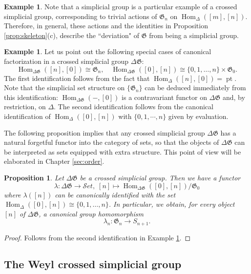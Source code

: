 \documentclass[english,11pt,leqno]{article}
\def\Gen{\mathfrak{G}}
\def\Hom{\operatorname{Hom}}
\def\pt{\operatorname{pt}\nolimits}
\def\lra{\longrightarrow}
\def\Hom{\operatorname{Hom}}
\def\Set{ {\mathcal Set}}
\def\Set{ {\mathcal Set}}
\def\DG{ {\Delta \Gen}}
\newtheorem{prop}[thm]{Proposition}
\theoremstyle{definition}
\newtheorem{exa}[thm]{Example}
\theoremstyle{remark}
\numberwithin{equation}{section}
\begin{document}
	\begin{exa}\label{exa:deviation}
Note that a simplicial group is a particular example of a crossed simplicial group, corresponding to
trivial actions of $\Gen_n$ on $\Hom_\Delta([m], [n])$. Therefore, in general, these actions and the identities
in Proposition \ref{prop:skeleton}(c), describe the ``deviation" of  $\Gen$  from being a simplicial
group. 
\end{exa}

\begin{exa}\label{ex:extreme} 
Let us point out the following special cases of canonical factorization in a crossed simplicial
group $\DG$:
\[
\Hom_\DG([n], [0]) \cong \Gen_n, \quad \Hom_\DG([0], [n]) \cong \{0,1,\dots, n\} \times \Gen_0. 
\]
The first identification follows from the fact that $\Hom_\Delta([n], [0]) = \pt$. Note that the
simplicial set structure on $\{\Gen_n\}$ can be deduced immediately from this identification:
$\Hom_\DG(-, [0])$ is a contravariant functor on $\DG$ and, by restriction, on $\Delta$. 
The second identification follows from the canonical identification of $\Hom_\Delta([0], [n])$ with
$\{0,1,\cdots, n\}$ given by evaluation.
\end{exa}

The following proposition implies that any crossed simplicial group $\DG$ has a natural forgetful
functor into the category of sets, so that the objects of $\DG$ can be interpreted as sets equipped with extra
structure. This point of view will be elaborated in Chapter \ref{sec:order}. 

\begin{prop}\label{prop:forget}
Let $\DG$ be a crossed simplicial group. Then we have a functor
\[
	\lambda: \DG \lra \Set, \; [n] \mapsto \Hom_{\DG}([0], [n])/\Gen_0
\]
where $\lambda([n])$ can be canonically identified with the set $\Hom_{\Delta}([0],[n]) \cong \{0,1,\dots,n\}$.
In particular, we obtain, for every object $[n]$ of $\DG$, a canonical group homomorphism
\[
	\lambda_{n}: \Gen_n \lra S_{n+1}.
\]
\end{prop}
\begin{proof}
	 Follows from the second identification in Example \ref{ex:extreme}. 
\end{proof}



\subsection{The Weyl crossed simplicial group}
\label{sub:weyl}
\end{document}
